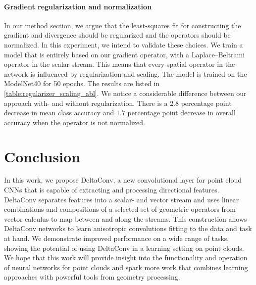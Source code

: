 \documentclass[acmtog, authorversion]{acmart}
\begin{document}
\paragraph*{Gradient regularization and normalization}
In our method section, we argue that the least-squares fit for constructing the gradient and divergence should be regularized and the operators should be normalized. In this experiment, we intend to validate these choices. We train a model that is entirely based on our gradient operator, with a Laplace--Beltrami operator in the scalar stream. This means that every spatial operator in the network is influenced by regularization and scaling. The model is trained on the ModelNet40 for 50 epochs. The results are listed in \autoref{table:regularizer_scaling_abl}. We notice a considerable difference between our approach with- and without regularization. There is a $2.8$ percentage point decrease in mean class accuracy and $1.7$ percentage point decrease in overall accuracy when the operator is not normalized.

\begin{table}[t]
    \caption{Classification accuracy on ModelNet40 with and without regularization and normalization.}
    \label{table:regularizer_scaling_abl}
    \begin{center}
    \end{center}
\end{table}  \section{Conclusion}
In this work, we propose DeltaConv, a new convolutional layer for point cloud CNNs that is capable of extracting and processing directional features. DeltaConv separates features into a scalar- and vector stream and uses linear combinations and compositions of a selected set of geometric operators from vector calculus to map between and along the streams. 
This construction allows DeltaConv networks to learn anisotropic convolutions fitting to the data and task at hand.
We demonstrate improved performance on a wide range of tasks, showing the potential of using DeltaConv in a learning setting on point clouds. We hope that this work will provide insight into the functionality and operation of neural networks for point clouds and spark more work that combines learning approaches with powerful tools from geometry processing.
\end{document}
